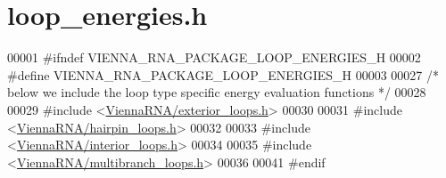 \hypertarget{loop__energies_8h_source}{}\section{loop\+\_\+energies.\+h}
\label{loop__energies_8h_source}

\begin{DoxyCode}
00001 \textcolor{preprocessor}{#ifndef VIENNA\_RNA\_PACKAGE\_LOOP\_ENERGIES\_H}
00002 \textcolor{preprocessor}{#define VIENNA\_RNA\_PACKAGE\_LOOP\_ENERGIES\_H}
00003 
00027 \textcolor{comment}{/* below we include the loop type specific energy evaluation functions */}
00028 
00029 \textcolor{preprocessor}{#include <\mbox{\hyperlink{exterior__loops_8h}{ViennaRNA/exterior\_loops.h}}>}
00030 
00031 \textcolor{preprocessor}{#include <\mbox{\hyperlink{hairpin__loops_8h}{ViennaRNA/hairpin\_loops.h}}>}
00032 
00033 \textcolor{preprocessor}{#include <\mbox{\hyperlink{interior__loops_8h}{ViennaRNA/interior\_loops.h}}>}
00034 
00035 \textcolor{preprocessor}{#include <\mbox{\hyperlink{multibranch__loops_8h}{ViennaRNA/multibranch\_loops.h}}>}
00036 
00041 \textcolor{preprocessor}{#endif}
\end{DoxyCode}

